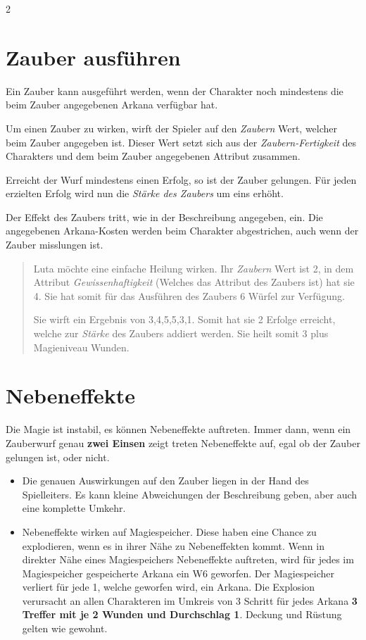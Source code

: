 \begin{multicols}{2}
\section{Zauber ausführen}

Ein Zauber kann ausgeführt werden, wenn der Charakter noch mindestens die beim Zauber angegebenen Arkana verfügbar hat.

Um einen Zauber zu wirken, wirft der Spieler auf den \textit{Zaubern} Wert, welcher beim Zauber angegeben ist. Dieser Wert setzt sich aus der \textit{Zaubern-Fertigkeit} des Charakters und dem beim Zauber angegebenen Attribut zusammen.

Erreicht der Wurf mindestens einen Erfolg, so ist der Zauber gelungen. Für jeden erzielten Erfolg wird nun die \textit{Stärke des Zaubers} um eins erhöht.

Der Effekt des Zaubers tritt, wie in der Beschreibung angegeben, ein. Die angegebenen Arkana-Kosten werden beim Charakter abgestrichen, auch wenn der Zauber misslungen ist.

\begin{quote}
Luta möchte eine einfache Heilung wirken. Ihr \textit{Zaubern} Wert ist 2, in dem Attribut \textit{Gewissenhaftigkeit} (Welches das Attribut des Zaubers ist) hat sie 4. Sie hat somit für das Ausführen des Zaubers 6 Würfel zur Verfügung.

Sie wirft ein Ergebnis von 3,4,5,5,3,1. Somit hat sie 2 Erfolge erreicht, welche zur \textit{Stärke} des Zaubers addiert werden. Sie heilt somit 3 plus Magieniveau Wunden.
\end{quote}

\section{Nebeneffekte}

Die Magie ist instabil, es können Nebeneffekte auftreten. Immer dann, wenn ein Zauberwurf genau \textbf{zwei Einsen} zeigt treten Nebeneffekte auf, egal ob der Zauber gelungen ist, oder nicht.
\begin{itemize}
    \item Die genauen Auswirkungen auf den Zauber liegen in der Hand des Spielleiters. Es kann kleine Abweichungen der Beschreibung geben, aber auch eine komplette Umkehr.
    \item Nebeneffekte wirken auf Magiespeicher. Diese haben eine Chance zu explodieren, wenn es in ihrer Nähe zu Nebeneffekten kommt. Wenn in direkter Nähe eines Magiespeichers Nebeneffekte auftreten, wird für jedes im Magiespeicher gespeicherte Arkana ein W6 geworfen. Der Magiespeicher verliert für jede 1, welche geworfen wird, ein Arkana. Die Explosion verursacht an allen Charakteren im Umkreis von 3 Schritt für jedes Arkana \textbf{3 Treffer mit je 2 Wunden und Durchschlag 1}. Deckung und Rüstung gelten wie gewohnt.
\end{itemize}


\end{multicols}
